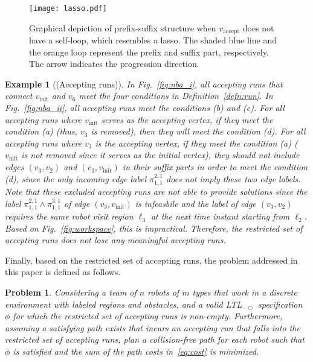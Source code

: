 \documentclass[Afour,sageh,times]{sagej}
\newtheorem{problem}{Problem}
\newtheorem{exmp}{Example}
\newcommand{\ltl}{ {\it LTL}$_{-\bigcirc}$ }
\newcommand{\vertex}[1]{v_{\text{#1}}}
\renewcommand{\ap}[3]{\mathcal{\pi}_{{#1},{#2}}^{#3}}
\newenvironment{cexmp}
{\addtocounter{exmp}{-1}\begin{exmp}}
  {\end{exmp}}
\begin{document}
\begin{figure}[t]
  \centering
  \texttt{[image: lasso.pdf]}
  \caption{Graphical depiction of prefix-suffix structure when $\vertex{accept}$ does not have a self-loop, which resembles a lasso. The shaded blue line and the orange loop  represent the prefix and suffix part, respectively. The arrow indicates the progression direction.}
  \label{fig:lasso}
\end{figure}


\begin{cexmp}[(Accepting runs)]
  In Fig.~\ref{fig:nba_i}, all accepting runs that connect $v_{\text{init}}$ and $v_6$ meet the four conditions in Definition~\ref{defn:run}. In Fig.~\ref{fig:nba_ii}, all accepting runs meet the conditions (b) and (c). For all accepting runs where $\vertex{init}$ serves as the accepting vertex, if they  meet the condition (a) (thus, $v_3$ is removed), then they  will meet the condition (d). For all accepting runs where $v_3$ is the accepting vertex, if they meet the condition (a) ($\vertex{init}$ is not removed since it serves as the initial vertex), they should not include edges $(v_3, v_2)$ and $(v_3, \vertex{init})$ in their suffix parts in order to meet the condition (d), since the only incoming edge label $\ap{1}{1}{2,1}$ does not imply these two edge labels. Note that these excluded  accepting runs are not able to provide solutions since the label $\ap{1}{1}{2,1} \wedge \ap{1}{1}{3,1}$ of edge $(v_3, \vertex{init})$ is infeasbile and the label of edge $(v_3, v_2)$ requires the same robot visit region $\ell_3$ at the next time instant starting from $\ell_2$. Based on Fig.~\ref{fig:workspace}, this is impractical. Therefore, the restricted set of accepting runs does not lose any  meaningful accepting runs.
\end{cexmp}

Finally, based on  the restricted set of accepting runs, the problem addressed in this paper is defined as follows.

\begin{problem}\label{prob:1}
Considering a team of $n$ robots of $m$ types that work in a discrete environment with labeled regions and obstacles, and a valid \ltl specification $\phi$ for which the restricted set of accepting runs is non-empty. Furthermore, assuming a satisfying path exists that incurs an accepting run that falls into the restricted set of accepting runs, plan a collision-free path for each robot such that $\phi$ is satisfied and the sum of the path costs in~\eqref{eq:cost} is minimized.
\end{problem}
\end{document}
